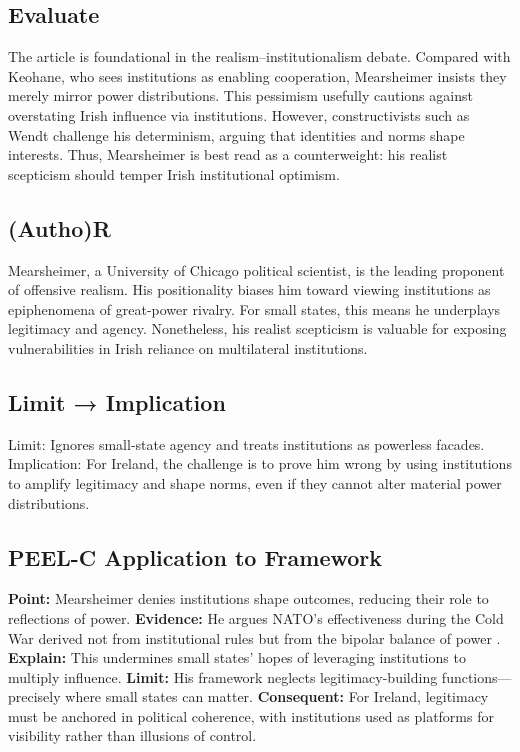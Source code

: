 \subsection*{Evaluate}
The article is foundational in the realism–institutionalism debate. Compared with Keohane, who sees institutions as enabling cooperation, Mearsheimer insists they merely mirror power distributions. This pessimism usefully cautions against overstating Irish influence via institutions. However, constructivists such as Wendt challenge his determinism, arguing that identities and norms shape interests. Thus, Mearsheimer is best read as a counterweight: his realist scepticism should temper Irish institutional optimism.

\subsection*{(Autho)R}
Mearsheimer, a University of Chicago political scientist, is the leading proponent of offensive realism. His positionality biases him toward viewing institutions as epiphenomena of great-power rivalry. For small states, this means he underplays legitimacy and agency. Nonetheless, his realist scepticism is valuable for exposing vulnerabilities in Irish reliance on multilateral institutions.

\subsection*{Limit → Implication}
Limit: Ignores small-state agency and treats institutions as powerless facades.  
Implication: For Ireland, the challenge is to prove him wrong by using institutions to amplify legitimacy and shape norms, even if they cannot alter material power distributions.

\subsection*{PEEL-C Application to Framework}
\textbf{Point:} Mearsheimer denies institutions shape outcomes, reducing their role to reflections of power.  
\textbf{Evidence:} He argues NATO’s effectiveness during the Cold War derived not from institutional rules but from the bipolar balance of power \parencite{MEARSHEIMER_1994}.  
\textbf{Explain:} This undermines small states’ hopes of leveraging institutions to multiply influence.  
\textbf{Limit:} His framework neglects legitimacy-building functions—precisely where small states can matter.  
\textbf{Consequent:} For Ireland, legitimacy must be anchored in political coherence, with institutions used as platforms for visibility rather than illusions of control.

